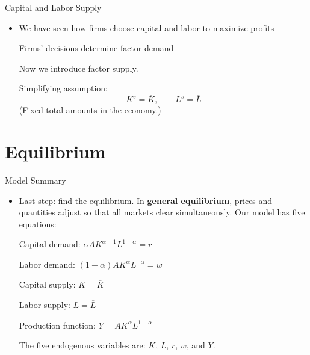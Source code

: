 \documentclass[10pt,aspectratio=169]{beamer}
\begin{document}
\begin{frame}{Capital and Labor Supply}

\begin{itemize}

\item We have seen how firms choose capital and labor to maximize profits

\itemvso Firms' decisions determine factor demand

\itemvso Now we introduce factor supply.

\itemvso Simplifying assumption:
\[
K^{s} = \overline{K}, 
\qquad 
L^{s} = \overline{L}
\]
(Fixed total amounts in the economy.)


\end{itemize}

\end{frame}

\section{Equilibrium}
\begin{frame}{Model Summary}

\begin{itemize}
\item Last step: find the equilibrium.
\itemvso In \textbf{general equilibrium}, prices and quantities adjust so that all markets clear simultaneously. Our model has five equations:

\itemvso Capital demand: \quad $\alpha A K^{\alpha-1} L^{1-\alpha} = r$

\itemvso Labor demand: \quad $(1-\alpha) A K^{\alpha} L^{-\alpha} = w$

\itemvso Capital supply: \quad $K = \overline{K}$

\itemvso Labor supply: \quad $L = \overline{L}$

\itemvso Production function: \quad $Y = A K^{\alpha} L^{1-\alpha}$

\itemvso The five endogenous variables are: $K$, $L$, $r$, $w$, and $Y$.

\end{itemize}

\end{frame}
\end{document}
